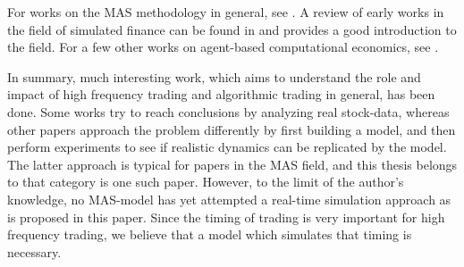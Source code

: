 For works on the MAS methodology in general, see \cite{davidsson2001multi, gilbert2004agent, macal2005tutorial}. A review of early works in the field of simulated finance can be found in \cite{lebaron2000agent} and provides a good introduction to the field. For a few other works on agent-based computational economics, see \cite{raberto2001agent, tesfatsion2002agent, tesfatsion2006agent, lebaron2001builder}.

In summary, much interesting work, which aims to understand the role and impact of high frequency trading and algorithmic trading in general, has been done. Some works try to reach conclusions by analyzing real stock-data, whereas other papers approach the problem differently by first building a model, and then perform experiments to see if realistic dynamics can be replicated by the model. The latter approach is typical for papers in the MAS field, and this thesis belongs to that category is one such paper. However, to the limit of the author's knowledge, no MAS-model has yet attempted a real-time simulation approach as is proposed in this paper. Since the timing of trading is very important for high frequency trading, we believe that a model which simulates that timing is necessary.

